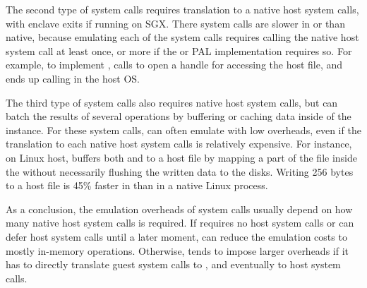 The second type of system calls requires translation to a native host system calls,
with enclave exits if running on SGX.
There system calls are slower in \graphene{} or \graphenesgx{} than native,
because emulating each of the system calls
requires calling the native host system call at least once,
or more if the \thelibos{} or PAL implementation
requires so.
For example, to implement , \thelibos{} calls  to open a handle
for accessing the host file,
and ends up calling  in the host OS.


The third type of system calls also requires native host system calls, but \thelibos{} can batch
the results of several operations by buffering
or caching data inside of the \libos{} instance.
For these system calls,
\thelibos{} can often emulate with low overheads,
even if the translation to each native host system calls is relatively expensive.
For instance, on Linux host, \thelibos{} buffers both  and  to a host file
by mapping a part of the file inside the \picoproc{}
without necessarily flushing the written data to the disks.
Writing 256 bytes
to a host file is \roughly{}45\% faster in \graphene{} than in a native Linux process.  


As a conclusion,
the emulation overheads of system calls usually depend on how many native host system calls
is required.
If \thelibos{} requires no host system calls
or can defer host system calls
until a later moment, \thelibos{} can reduce the emulation costs to mostly in-memory operations.
Otherwise,
\thelibos{} tends to impose larger overheads
if it has to directly translate guest system calls to \hostapis{}, and eventually to host system calls.





